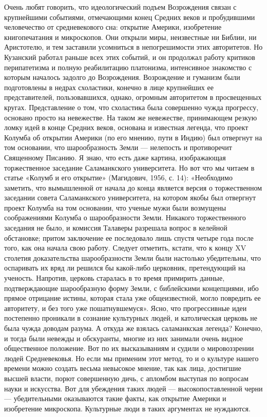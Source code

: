 Очень любят говорить, что идеологический подъем Возрождения связан с
крупнейшими событиями, отмечающими конец Средних веков и пробудившими
человечество от средневекового сна: открытие Америки, изобретение
книгопечатания и микроскопов. Они открыли миры, неизвестные ни Библии,
ни Аристотелю, и тем заставили усомниться в непогрешимости этих
авторитетов. Но Кузанский работал раньше всех этих событий, и он
продолжал работу критиков перипатетизма и полную реабилитацию
платонизма, интенсивное знакомство с которым началось задолго до
Возрождения. Возрождение и гуманизм были подготовлены в недрах
схоластики, конечно в лице крупнейших ее представителей,
пользовавшихся, однако, огромным авторитетом в просвещенных кругах.
Представление о том, что схоластика была совершенно чужда прогрессу,
основано просто на невежестве. На таком же невежестве, принимающем
резкую ломку идей в конце Средних веков, основана и известная легенда,
что проект Колумба об открытии Америки (по его мнению, пути в Индию)
был отвергнут на том основании, что шарообразность Земли --- нелепость
и противоречит Священному Писанию. Я знаю, что есть даже картина,
изображающая торжественное заседание Саламанкского университета. Но
вот что мы читаем в статье «Колумб и его открытие» (Магидович, 1956,
с. 14): «Необходимо заметить, что вымышленной от начала до конца
является версия о торжественном заседании совета Саламанкского
университета, на котором якобы был отвергнут проект Колумба на том
основании, что ученые мужи были возмущены соображениями Колумба о
шарообразности Земли. Никакого торжественного заседания не было, и
комиссия Талаверы разрешала вопрос в келейной обстановке; притом
заключение ее последовало лишь спустя четыре года после того, как она
начала свою работу. Следует отметить, кстати, что к концу XV столетия
доказательства шарообразности Земли были настолько убедительны, что
оспаривать их вряд ли решился бы какой-либо церковник, претендующий на
ученость. Напротив, церковь старалась в то время примирить данные,
подтверждающие шарообразную форму Земли, с библейскими концепциями,
ибо прямое отрицание истины, которая стала уже общеизвестной, могло
повредить ее авторитету, и без того уже пошатнувшемуся». Ясно, что
прогрессивные идеи постепенно проникали в сознание культурных людей, и
католическая церковь не была чужда доводам разума. А откуда же взялась
саламанкская легенда? Конечно, и тогда были невежды и обскуранты,
многие из них занимали очень видное общественное положение. Вот по их
высказываниям и судили о мировоззрении людей Средневековья. Но если мы
применим этот метод, то и о культуре нашего времени можно создать
весьма невысокое мнение, так как лица, достигшие высшей власти, порют
совершенную дичь, с апломбом выступая по вопросам науки и искусства.
Вот для убеждения таких людей --- высокопоставленной черни ---
убедительными оказываются такие факты, как открытие Америки и
изобретение микроскопа. Культурные люди в таких аргументах не
нуждаются.

